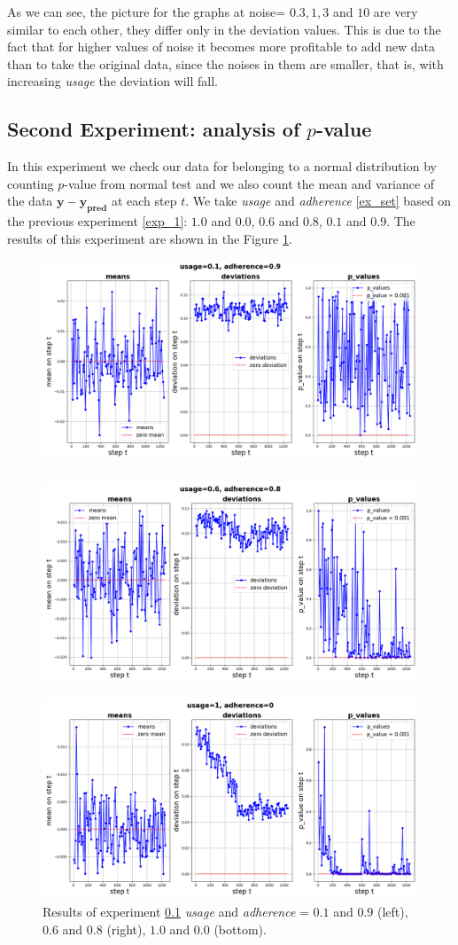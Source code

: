 \documentclass{article}
\begin{document}
        As we can see, the picture for the graphs at noise= $0.3, 1, 3$ and $10$ are very similar to each other, they differ only in the deviation values. This is due to the fact that for higher values of noise it becomes more profitable to add new data than to take the original data, since the noises in them are smaller, that is, with increasing \textit{usage} the deviation will fall.

    \newpage

    \subsection{Second Experiment: analysis of $p$-value} \label{exp_2}
        In this experiment we check our data for belonging to a normal distribution by counting $p$-value from normal test and we also count the mean and variance of the data $\mathbf{y} - \mathbf{y_{\text{pred}}}$ at each step $t$. We take \textit{usage} and \textit{adherence} \ref{ex_set} based on the previous experiment \ref{exp_1}: $1.0$ and $0.0$, $0.6$ and $0.8$, $0.1$ and $0.9$. The results of this experiment are shown in the Figure \ref{fig_exp_2}.

        \begin{figure}[h!]
            \centering
            \includegraphics[width=0.49\linewidth]{pictures/mdp_0.1_0.9.png}~~
            ~~\includegraphics[width=0.49\linewidth]{pictures/mdp_0.6_0.8.png}
            
            \includegraphics[width=0.49\linewidth]{pictures/mdp_1_0.png}
            
            \caption{Results of experiment \ref{exp_2} \textit{usage} and \textit{adherence} = $0.1$ and $0.9$ (left), $0.6$ and $0.8$ (right), $1.0$ and $0.0$ (bottom).}
            \label{fig_exp_2}
        \end{figure}
\end{document}
